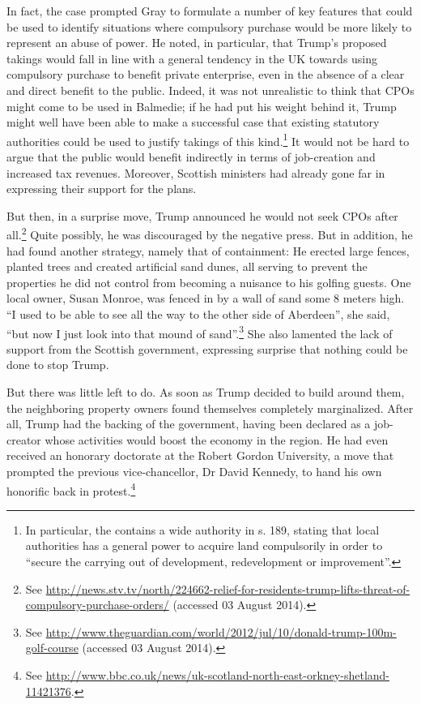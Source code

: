 In fact, the case prompted Gray to formulate a number of key features that could be used to identify situations where compulsory purchase would be more likely to represent an abuse of power. He noted, in particular, that Trump's proposed takings would fall in line with a general tendency in the UK towards using compulsory purchase to benefit private enterprise, even in the absence of a clear and direct benefit to the public. Indeed, it was not unrealistic to think that CPOs might come to be used in Balmedie; if he had put his weight behind it, Trump might well have been able to make a successful case that existing statutory authorities could be used to justify takings of this kind.\footnote{In particular, the \cite{tcpsa97} contains a wide authority in s. 189, stating that local authorities has a general power to acquire land compulsorily in order to ``secure the carrying out of development, redevelopment or improvement''.} It would not be hard to argue that the public would benefit indirectly in terms of job-creation and increased tax revenues. Moreover, Scottish ministers had already gone far in expressing their support for the plans.

But then, in a surprise move, Trump announced he would not seek CPOs after all.\footnote{See \url{http://news.stv.tv/north/224662-relief-for-residents-trump-lifts-threat-of-compulsory-purchase-orders/} (accessed 03 August 2014).} Quite possibly, he was discouraged by the negative press. But in addition, he had found another strategy, namely that of containment: He erected large fences, planted trees and created artificial sand dunes, all serving to prevent the properties he did not control from becoming a nuisance to his golfing guests. One local owner, Susan Monroe, was fenced in by a wall of sand some 8 meters high. ``I used to be able to see all the way to the other side of Aberdeen'', she said, ``but now I just look into that mound of sand''.\footnote{See \url{http://www.theguardian.com/world/2012/jul/10/donald-trump-100m-golf-course} (accessed 03 August 2014).} She also lamented the lack of support from the Scottish government, expressing surprise that nothing could be done to stop Trump.

But there was little left to do. As soon as Trump decided to build around them, the neighboring property owners found themselves completely marginalized. After all, Trump had the backing of the government, having been declared as a job-creator whose activities would boost the economy in the region. He had even received an honorary doctorate at the Robert Gordon University, a move that prompted the previous vice-chancellor, Dr David Kennedy, to hand his own honorific back in protest.\footnote{See \url{http://www.bbc.co.uk/news/uk-scotland-north-east-orkney-shetland-11421376}.}

